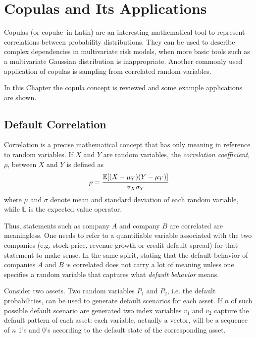 \chapter{Copulas and Its Applications}

Copulas (or copul\ae~in Latin) are an interesting mathematical tool to represent correlations between probability distributions. They can be used to describe complex dependencies in multivariate risk models, when more basic tools such as a multivariate Gaussian distribution is inappropriate. Another commonly used application of copulas is sampling from correlated random variables.

In this Chapter the copula concept is reviewed and some example applications are shown. 

\section{Default Correlation}\label{sec:default_correlation}
Correlation is a precise mathematical concept that has only meaning in reference to random variables. If $X$ and $Y$ are random variables, the \emph{correlation coefficient}, $\rho$, between $X$ and $Y$ is defined as
\begin{equation}
\rho = \cfrac{\mathbb{E}[(X-\mu_Y)(Y-\mu_Y)]}{\sigma_X \sigma_Y}
\label{eq:correlation_coefficient}
\end{equation}
where $\mu$ and $\sigma$ denote mean and standard deviation of each random variable, while $\mathbb{E}$ is the expected value operator.

Thus, statements such as company $A$ and company $B$ are correlated are meaningless. One needs to refer to a quantifiable variable associated with the two companies (e.g. stock price, revenue growth or credit default spread) for that statement to make sense.
In the same spirit, stating that the default behavior of companies $A$ and $B$ is correlated does not carry a lot of meaning unless one specifies a random variable that captures what \emph{default behavior} means. %

Consider two assets. Two random variables $P_1$ and $P_2$, i.e. the default probabilities, can be used to generate default scenarios for each asset. If $n$ of such possible default scenario are generated two index variables $v_1$ and $v_2$ capture the default pattern of each asset: each variable, actually a vector, will be a sequence of $n$ 1’s and 0’s according to the default state of the corresponding asset.


